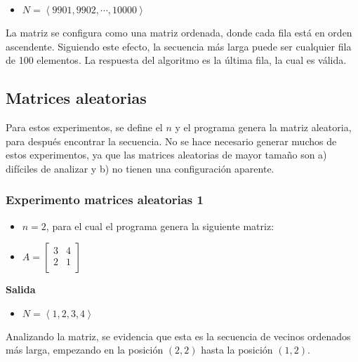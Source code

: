 \documentclass[letter]{article}
\begin{document}
\begin{itemize}
    \item $N = \left< 9901, 9902, \cdots, 10000 \right>$
\end{itemize}

La matriz se configura como una matriz ordenada, donde cada fila está en orden ascendente. Siguiendo este efecto, la secuencia más larga puede ser cualquier fila de 100 elementos. La respuesta del algoritmo es la última fila, la cual es válida. \par

\newpage

\subsection{Matrices aleatorias}

Para estos experimentos, se define el $n$ y el programa genera la matriz aleatoria, para después encontrar la secuencia. No se hace necesario generar muchos de estos experimentos, ya que las matrices aleatorias de mayor tamaño son a) difíciles de analizar y b) no tienen una configuración aparente. \par

\subsubsection{Experimento matrices aleatorias 1}

\begin{itemize}
    \item $n = 2$, para el cual el programa genera la siguiente matriz:
    \item $ A = 
        \begin{bmatrix}
        3 & 4 \\
        2 & 1 \\
        \end{bmatrix}
    $
\end{itemize}

\textbf{Salida} \par

\begin{itemize}
    \item $N = \left< 1, 2, 3, 4 \right>$
\end{itemize}

Analizando la matriz, se evidencia que esta es la secuencia de vecinos ordenados más larga, empezando en la posición $(2,2)$ hasta la posición $(1,2)$. \par
\end{document}
